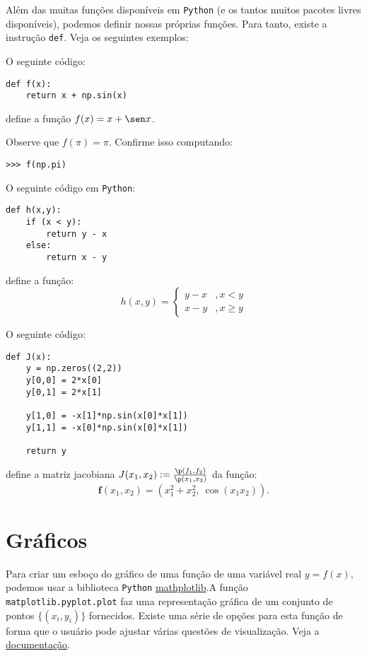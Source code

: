 Além das muitas funções disponíveis em \verb+Python+ (e os tantos muitos pacotes livres disponíveis), podemos definir nossas próprias funções. Para tanto, existe a instrução \verb+def+. Veja os seguintes exemplos:

\begin{ex}
  O seguinte código:
\begin{verbatim}
def f(x):
    return x + np.sin(x)
\end{verbatim}
define a função $f(x) = x + \sen x$.

Observe que $f(\pi) = \pi$. Confirme isso computando:
\begin{verbatim}
>>> f(np.pi)
\end{verbatim}
\end{ex}

\begin{ex}
  O seguinte código em \verb+Python+:
\begin{verbatim}
def h(x,y):
    if (x < y):
        return y - x
    else:
        return x - y
\end{verbatim}
define a função:
\begin{equation}
  h(x,y) = \left\{
    \begin{array}{ll}
      y - x &, x < y\\
      x - y &, x \geq y
    \end{array}
\right.
\end{equation}
\end{ex}

\begin{ex}
  O seguinte código:
\begin{verbatim}
def J(x):
    y = np.zeros((2,2))
    y[0,0] = 2*x[0]
    y[0,1] = 2*x[1]

    y[1,0] = -x[1]*np.sin(x[0]*x[1])
    y[1,1] = -x[0]*np.sin(x[0]*x[1])

    return y
\end{verbatim}
define a matriz jacobiana $J(x_1,x_2) := \frac{\p(f_1,f_2)}{\p(x_1,x_2)}$ da função:
\begin{equation}
  \pmb{f}(x_1,x_2) = (x_1^2 + x_2^2,~\cos(x_1x_2)).
\end{equation}
\end{ex}

\section{Gráficos}

Para criar um esboço do gráfico de uma função de uma variável real $y = f(x)$, podemos usar a biblioteca \verb+Python+ \href{https://matplotlib.org/}{mathplotlib}.A função \verb+matplotlib.pyplot.plot+ faz uma representação gráfica de um conjunto de pontos $\{(x_i, y_i)\}$ fornecidos. Existe uma série de opções para esta função de forma que o usuário pode ajustar várias questões de visualização. Veja a \href{https://matplotlib.org/api/pyplot_api.html?highlight=pyplot.plot#matplotlib.pyplot.plot}{documentação}.

